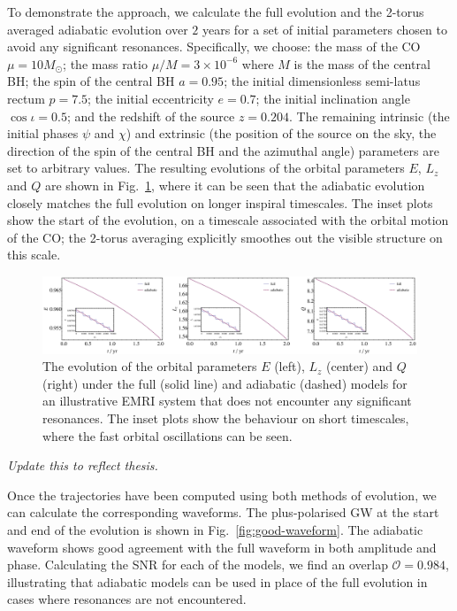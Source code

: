 \documentclass[aps,prd,amsfonts,amssymb,amsmath,nofootinbib,showpacs,superscriptaddress,twocolumn]{revtex4}
\newcommand{\figref}[1]{Fig.\ \ref{fig:#1}}
\begin{document}
To demonstrate the approach, we calculate the full evolution and the 2-torus averaged adiabatic evolution over $2$ years for a set of initial parameters chosen to avoid any significant resonances. Specifically, we choose: the mass of the CO $\mu = 10 M_{\odot}$; the mass ratio $\mu / M = 3\times 10^{-6}$ where $M$ is the mass of the central BH; the spin of the central BH $a=0.95$; the initial dimensionless semi-latus rectum $p=7.5$; the initial eccentricity $e=0.7$; the initial inclination angle $\cos \iota = 0.5$; and the redshift of the source $z=0.204$. The remaining intrinsic (the initial phases $\psi$ and $\chi$) and extrinsic (the position of the source on the sky, the direction of the spin of the central BH and the azimuthal angle) parameters are set to arbitrary values. The resulting evolutions of the orbital parameters $E$, $L_z$ and $Q$ are shown in \figref{good-traj}, where it can be seen that the adiabatic evolution closely matches the full evolution on longer inspiral timescales. The inset plots show the start of the evolution, on a timescale associated with the orbital motion of the CO; the 2-torus averaging explicitly smoothes out the visible structure on this scale.

\begin{figure}[htbp]
\centering
\includegraphics[width=\textwidth]{Fig_good_traj}
\caption{\label{fig:good-traj}The evolution of the orbital parameters $E$ (left), $L_z$ (center) and $Q$ (right) under the full (solid line) and adiabatic (dashed) models for an illustrative EMRI system that does not encounter any significant resonances. The inset plots show the behaviour on short timescales, where the fast orbital oscillations can be seen.}
\end{figure}

\emph{Update this to reflect thesis.}

Once the trajectories have been computed using both methods of evolution, we can calculate the corresponding waveforms. The plus-polarised GW at the start and end of the evolution is shown in \figref{good-waveform}. The adiabatic waveform shows good agreement with the full waveform in both amplitude and phase. Calculating the SNR for each of the models, we find an overlap $\mathcal{O} = 0.984$, illustrating that adiabatic models can be used in place of the full evolution in cases where resonances are not encountered.
\end{document}
